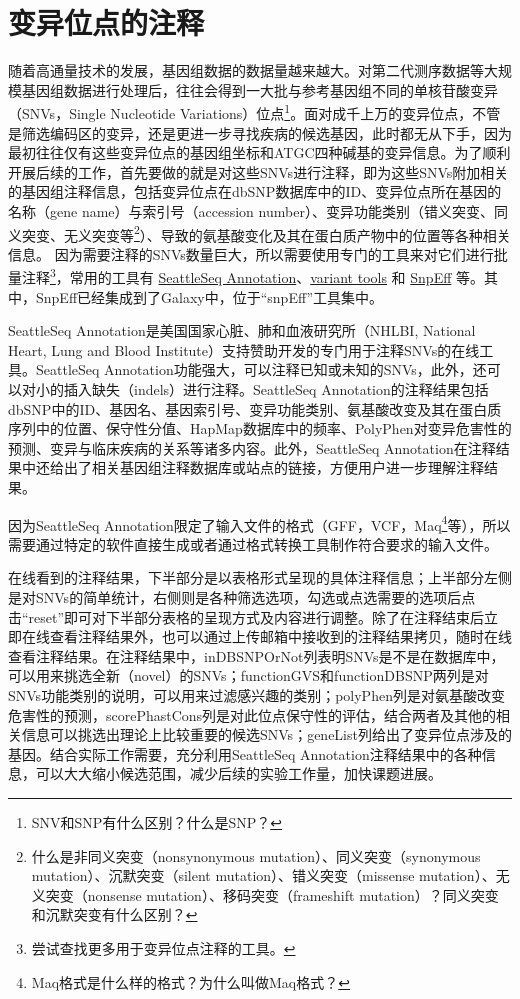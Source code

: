 \documentclass[11pt,a4paper,twoside]{book}
\begin{document}
\section{变异位点的注释}
随着高通量技术的发展，基因组数据的数据量越来越大。对第二代测序数据等大规模基因组数据进行处理后，往往会得到一大批与参考基因组不同的单核苷酸变异（SNVs，Single Nucleotide Variations）位点\footnote{SNV和SNP有什么区别？什么是SNP？}。面对成千上万的变异位点，不管是筛选编码区的变异，还是更进一步寻找疾病的候选基因，此时都无从下手，因为最初往往仅有这些变异位点的基因组坐标和ATGC四种碱基的变异信息。为了顺利开展后续的工作，首先要做的就是对这些SNVs进行注释，即为这些SNVs附加相关的基因组注释信息，包括变异位点在dbSNP数据库中的ID、变异位点所在基因的名称（gene name）与索引号（accession number）、变异功能类别（错义突变、同义突变、无义突变等\footnote{什么是非同义突变（nonsynonymous mutation）、同义突变（synonymous mutation）、沉默突变（silent mutation）、错义突变（missense mutation）、无义突变（nonsense mutation）、移码突变（frameshift mutation）？同义突变和沉默突变有什么区别？}）、导致的氨基酸变化及其在蛋白质产物中的位置等各种相关信息。 因为需要注释的SNVs数量巨大，所以需要使用专门的工具来对它们进行批量注释\footnote{尝试查找更多用于变异位点注释的工具。}，常用的工具有 \href{http://snp.gs.washington.edu/SeattleSeqAnnotation137/index.jsp}{SeattleSeq Annotation}、\href{http://varianttools.sourceforge.net}{variant tools} 和 \href{http://snpeff.sourceforge.net}{SnpEff} 等。其中，SnpEff已经集成到了Galaxy中，位于“snpEff”工具集中。

SeattleSeq Annotation是美国国家心脏、肺和血液研究所（NHLBI, National Heart, Lung and Blood Institute）支持赞助开发的专门用于注释SNVs的在线工具。SeattleSeq Annotation功能强大，可以注释已知或未知的SNVs，此外，还可以对小的插入缺失（indels）进行注释。SeattleSeq Annotation的注释结果包括dbSNP中的ID、基因名、基因索引号、变异功能类别、氨基酸改变及其在蛋白质序列中的位置、保守性分值、HapMap数据库中的频率、PolyPhen对变异危害性的预测、变异与临床疾病的关系等诸多内容。此外，SeattleSeq Annotation在注释结果中还给出了相关基因组注释数据库或站点的链接，方便用户进一步理解注释结果。

因为SeattleSeq Annotation限定了输入文件的格式（GFF，VCF，Maq\footnote{Maq格式是什么样的格式？为什么叫做Maq格式？}等），所以需要通过特定的软件直接生成或者通过格式转换工具制作符合要求的输入文件。

在线看到的注释结果，下半部分是以表格形式呈现的具体注释信息；上半部分左侧是对SNVs的简单统计，右侧则是各种筛选选项，勾选或点选需要的选项后点击“reset”即可对下半部分表格的呈现方式及内容进行调整。除了在注释结束后立即在线查看注释结果外，也可以通过上传邮箱中接收到的注释结果拷贝，随时在线查看注释结果。在注释结果中，inDBSNPOrNot列表明SNVs是不是在数据库中，可以用来挑选全新（novel）的SNVs；functionGVS和functionDBSNP两列是对SNVs功能类别的说明，可以用来过滤感兴趣的类别；polyPhen列是对氨基酸改变危害性的预测，scorePhastCons列是对此位点保守性的评估，结合两者及其他的相关信息可以挑选出理论上比较重要的候选SNVs；geneList列给出了变异位点涉及的基因。结合实际工作需要，充分利用SeattleSeq Annotation注释结果中的各种信息，可以大大缩小候选范围，减少后续的实验工作量，加快课题进展。
\end{document}
